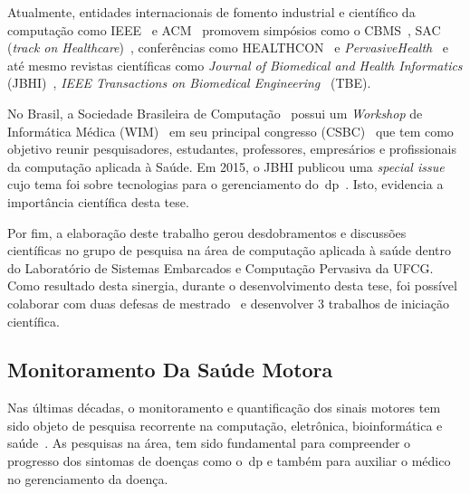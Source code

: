 
Atualmente, entidades internacionais de fomento industrial e científico da computação como IEEE~\cite{ieee2016} e ACM~\cite{acm2016} promovem simpósios como o CBMS~\cite{cbms2016}, SAC (\textit{track on Healthcare})~\cite{sachealth2016}, conferências como HEALTHCON~\cite{healthcon2016} e \textit{PervasiveHealth}~\cite{pervasivehealth2016} e até mesmo revistas científicas como \textit{Journal of Biomedical and Health Informatics} (JBHI)~\cite{jbhi2016}, \textit{IEEE Transactions on Biomedical Engineering}~\cite{tbe2016} (TBE). 

No Brasil, a Sociedade Brasileira de Computação~\cite{sbc2016} possui um \textit{Workshop} de Informática Médica (WIM)~\cite{wim2016} em seu principal congresso (CSBC)~\cite{csbc2016} que tem como objetivo reunir pesquisadores, estudantes, professores, empresários e profissionais da computação aplicada à Saúde. Em 2015, o JBHI publicou uma \textit{special issue} cujo tema foi sobre tecnologias para o gerenciamento do~\ac{dp}~\cite{specjbhi2015}. Isto, evidencia a importância científica desta tese. %

Por fim, a elaboração deste trabalho gerou desdobramentos e discussões científicas no grupo de pesquisa na área de computação aplicada à saúde dentro do Laboratório de Sistemas Embarcados e Computação Pervasiva da UFCG. Como resultado desta sinergia, durante o desenvolvimento desta tese, foi possível colaborar com duas defesas de mestrado~\cite{antonio2013,gustavo2014} e desenvolver 3 trabalhos de iniciação científica. 


\subsection{Monitoramento Da Saúde Motora}
Nas últimas décadas, o monitoramento e quantificação dos sinais motores tem sido objeto de pesquisa recorrente na computação, eletrônica, bioinformática e saúde~\cite{reviewassesenspark2015}. As pesquisas na área, tem sido fundamental para compreender o progresso dos sintomas de doenças como o~\ac{dp} e também para auxiliar o médico no gerenciamento da doença.

